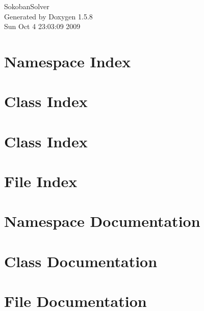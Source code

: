 \documentclass[a4paper]{book}
\begin{document}
\begin{titlepage}
\vspace*{7cm}
\begin{center}
{\Large SokobanSolver }\\
\vspace*{1cm}
{\large Generated by Doxygen 1.5.8}\\
\vspace*{0.5cm}
{\small Sun Oct 4 23:03:09 2009}\\
\end{center}
\end{titlepage}
\clearemptydoublepage
{}
\tableofcontents
\clearemptydoublepage
{}
\chapter{Namespace Index}

\chapter{Class Index}

\chapter{Class Index}

\chapter{File Index}

\chapter{Namespace Documentation}

\chapter{Class Documentation}








\chapter{File Documentation}







\printindex
\end{document}
